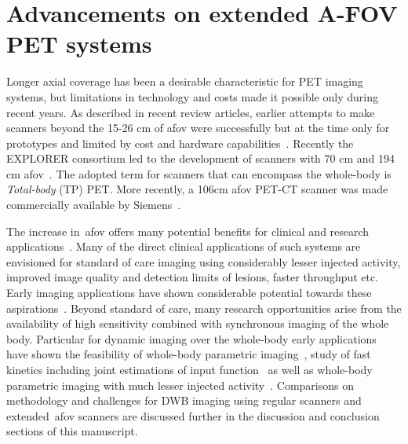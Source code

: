 \section{Advancements on extended A-FOV PET systems}
Longer axial coverage has been a desirable characteristic for PET imaging systems, but limitations in technology and costs made it possible only during recent years. 
As described in recent review articles, earlier attempts to make scanners beyond the 15-26 cm of \gls{afov} were successfully but at the time only for prototypes and limited by cost and hardware capabilities~\cite{Vandenberghe2020,Surti2020}.
Recently the EXPLORER consortium led to the development of scanners with 70 cm and 194 cm \gls{afov}~\cite{Karp2020,Cherry2017}. The adopted term for scanners that can encompass the whole-body is \textit{Total-body} (TP) PET. More recently, a 106cm \gls{afov} PET-CT scanner was made commercially available by Siemens~\cite{Siegel2020}. 

The increase in~\gls{afov} offers many potential benefits for clinical and research applications~\cite{Slart2021}. Many of the direct clinical applications of such systems are envisioned for standard of care imaging using considerably lesser injected activity, improved image quality and detection limits of lesions, faster throughput etc. Early imaging applications have shown considerable potential towards these aspirations~\cite{Badawi2019,Pantel2020}.
Beyond standard of care, many research opportunities arise from the availability of high sensitivity combined with synchronous imaging of the whole body. 
Particular for dynamic imaging over the whole-body early applications have shown the feasibility of whole-body parametric imaging~\cite{Zhang2020a,Zhang2020b,Wang208}, study of fast kinetics including joint estimations of input function~\cite{Feng2019,Feng2021} as well as whole-body parametric imaging with much lesser injected activity~\cite{Liu2021}.
Comparisons on methodology and challenges for DWB imaging using regular scanners and extended~\gls{afov} scanners are discussed further in the discussion and conclusion sections of this manuscript.
